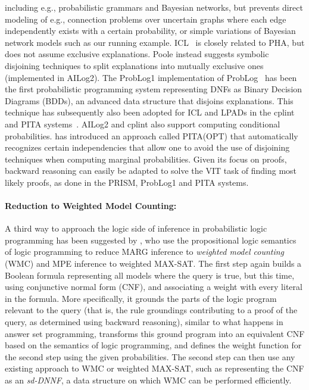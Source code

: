 \documentclass[a4paper]{article}
\begin{document}
including e.g., probabilistic grammars and Bayesian networks, but
prevents direct modeling of e.g., connection problems over uncertain graphs where each edge
independently exists with a certain probability, or simple
variations of Bayesian network models such as our running example. ICL~\citep{Poole00} is closely
related to PHA, but does not assume exclusive explanations. Poole
instead suggests symbolic disjoining techniques to split explanations into
mutually exclusive ones (implemented in AILog2). The ProbLog1
implementation of ProbLog~\citep{DeRaedt07-IJCAIa,Kimmig11} has
been the first probabilistic programming system representing DNFs as Binary Decision
Diagrams (BDDs), an advanced
data structure that disjoins explanations. This technique has
subsequently also been adopted for ICL and
LPADs in the cplint and PITA
systems~\citep{Riguzzi09,Riguzzi11}. AILog2 and cplint also support
computing conditional probabilities. \cite{riguzzi:tcj13} has introduced
an approach called PITA(OPT) that automatically recognizes certain independencies that
allow one to avoid the use of disjoining techniques when computing marginal probabilities. Given its focus on proofs, backward
reasoning can easily be adapted to solve the VIT task of finding most
likely proofs, as done in the PRISM, ProbLog1 and PITA systems.  



\paragraph{Reduction to Weighted Model Counting:} A third way to approach the logic side of inference in probabilistic
logic programming has been suggested by \cite{Fierens11,Fierens13}, who use   
the propositional logic semantics of logic
programming  to reduce MARG inference to 
\emph{weighted model counting} (WMC) and MPE inference to weighted MAX-SAT. The first step again builds a
Boolean formula representing all models where the query
is true, but this time, using conjunctive normal form (CNF), and
associating a weight with every literal in the formula. More specifically, it grounds the parts of
the logic program relevant to the query (that is, the rule groundings
contributing to a proof of the query, as determined using backward
reasoning), similar to what happens in
answer set programming, transforms this ground
program into an equivalent CNF based on the semantics of logic
programming, and defines the weight function for the second step using
the given probabilities.  The
second step can then use any existing approach to
WMC or weighted MAX-SAT, such as representing 
 the CNF as an  \emph{sd-DNNF}, a data structure on which WMC can be performed
efficiently. 
\end{document}
